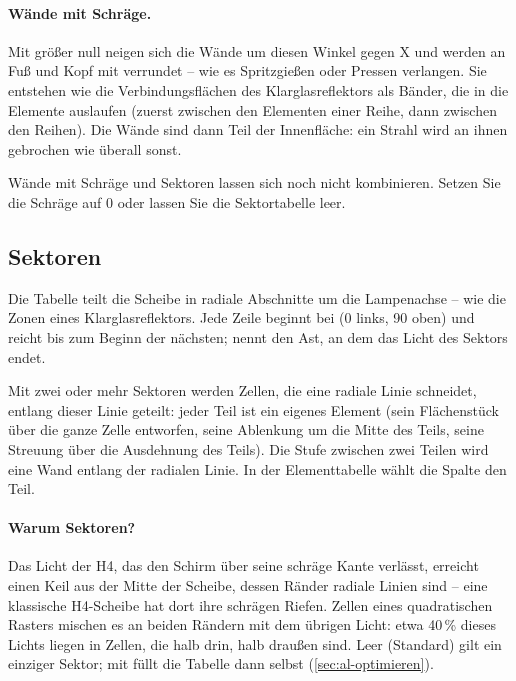 \paragraph{Wände mit Schräge.} Mit  größer null neigen sich die Wände
um diesen Winkel gegen X und werden an Fuß und Kopf mit  verrundet --
wie es Spritzgießen oder Pressen verlangen. Sie entstehen wie die Verbindungsflächen des
Klarglasreflektors als Bänder, die in die Elemente auslaufen (zuerst zwischen den Elementen einer
Reihe, dann zwischen den Reihen). Die Wände sind dann Teil der Innenfläche: ein Strahl wird an ihnen
gebrochen wie überall sonst.

\begin{warnung}
Wände mit Schräge und Sektoren lassen sich noch nicht kombinieren. Setzen Sie die Schräge auf 0 oder
lassen Sie die Sektortabelle leer.
\end{warnung}

\subsection{Sektoren}\label{sec:al-sektoren}

Die Tabelle  teilt die Scheibe in radiale Abschnitte um die Lampenachse -- wie die Zonen
eines Klarglasreflektors. Jede Zeile beginnt bei  (0 links, 90 oben) und reicht bis
zum Beginn der nächsten;  nennt den Ast, an dem das Licht des Sektors endet.

Mit zwei oder mehr Sektoren werden Zellen, die eine radiale Linie schneidet, entlang dieser Linie
geteilt: jeder Teil ist ein eigenes Element (sein Flächenstück über die ganze Zelle entworfen, seine
Ablenkung um die Mitte des Teils, seine Streuung über die Ausdehnung des Teils). Die Stufe zwischen
zwei Teilen wird eine Wand entlang der radialen Linie. In der Elementtabelle wählt die Spalte
 den Teil.

\paragraph{Warum Sektoren?} Das Licht der H4, das den Schirm über seine schräge Kante verlässt,
erreicht einen Keil aus der Mitte der Scheibe, dessen Ränder radiale Linien sind -- eine klassische
H4-Scheibe hat dort ihre schrägen Riefen. Zellen eines quadratischen Rasters mischen es an beiden
Rändern mit dem übrigen Licht: etwa 40\,\% dieses Lichts liegen in Zellen, die halb drin, halb draußen
sind. Leer (Standard) gilt ein einziger Sektor;  mit  füllt die Tabelle dann selbst (\autoref{sec:al-optimieren}).

